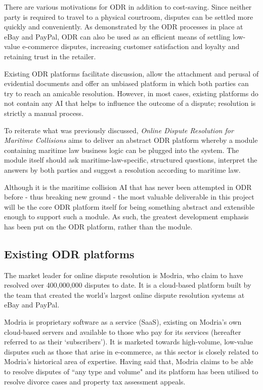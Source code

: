 There are various motivations for ODR in addition to cost-saving. Since neither party is required to travel to a physical courtroom, disputes can be settled more quickly and conveniently. As demonstrated by the ODR processes in place at eBay and PayPal, ODR can also be used as an efficient means of settling low-value e-commerce disputes, increasing customer satisfaction and loyalty and retaining trust in the retailer.

Existing ODR platforms facilitate discussion, allow the attachment and perusal of evidential documents and offer an unbiased platform in which both parties can try to reach an amicable resolution. However, in most cases, existing platforms do not contain any AI that helps to influence the outcome of a dispute; resolution is strictly a manual process.

To reiterate what was previously discussed, \emph{Online Dispute Resolution for Maritime Collisions} aims to deliver an abstract ODR platform whereby a module containing maritime law business logic can be plugged into the system. The module itself should ask maritime-law-specific, structured questions, interpret the answers by both parties and suggest a resolution according to maritime law.

Although it is the maritime collision AI that has never been attempted in ODR before - thus breaking new ground - the most valuable deliverable in this project will be the core ODR platform itself for being something abstract and extensible enough to support such a module. As such, the greatest development emphasis has been put on the ODR platform, rather than the module.

\subsection{Existing ODR platforms}

The market leader for online dispute resolution is Modria, who claim to have resolved over 400,000,000 disputes to date. It is a cloud-based platform built by the team that created the world's largest online dispute resolution systems at eBay and PayPal.~\cite{modria:about}

Modria is proprietary software as a service (SaaS), existing on Modria's own cloud-based servers and available to those who pay for its services (hereafter referred to as their `subscribers'). It is marketed towards high-volume, low-value disputes such as those that arise in e-commerce, as this sector is closely related to Modria's historical area of expertise. Having said that, Modria claims to be able to resolve disputes of ``any type and volume" and its platform has been utilised to resolve divorce cases and property tax assessment appeals.~\cite{modria:interview}

